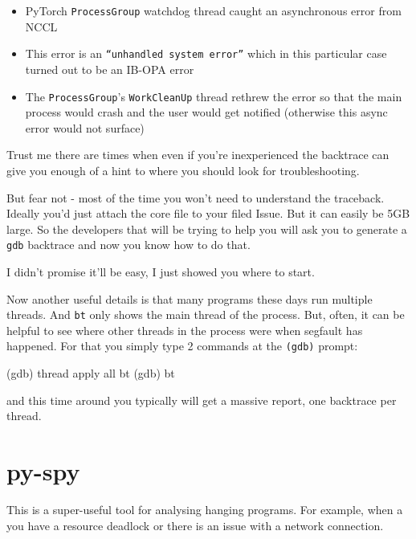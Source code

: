 \documentclass[
]{report}
\newenvironment{Shaded}{\begin{snugshade}}{\end{snugshade}}
\newcommand{\ExtensionTok}[1]{\textcolor[rgb]{0.00,0.23,0.31}{#1}}
\newcommand{\FunctionTok}[1]{\textcolor[rgb]{0.28,0.35,0.67}{#1}}
\newcommand{\KeywordTok}[1]{\textcolor[rgb]{0.00,0.23,0.31}{#1}}
\newcommand{\NormalTok}[1]{\textcolor[rgb]{0.00,0.23,0.31}{#1}}
\providecommand{\tightlist}{%
  \setlength{\itemsep}{0pt}\setlength{\parskip}{0pt}}\usepackage{longtable,booktabs,array}
\begin{document}
\begin{itemize}
\tightlist
\item
  PyTorch \texttt{ProcessGroup} watchdog thread caught an asynchronous
  error from NCCL
\item
  This error is an \texttt{“unhandled\ system\ error”} which in this
  particular case turned out to be an IB-OPA error
\item
  The \texttt{ProcessGroup}'s \texttt{WorkCleanUp} thread rethrew the
  error so that the main process would crash and the user would get
  notified (otherwise this async error would not surface)
\end{itemize}

Trust me there are times when even if you're inexperienced the backtrace
can give you enough of a hint to where you should look for
troubleshooting.

But fear not - most of the time you won't need to understand the
traceback. Ideally you'd just attach the core file to your filed Issue.
But it can easily be 5GB large. So the developers that will be trying to
help you will ask you to generate a \texttt{gdb} backtrace and now you
know how to do that.

I didn't promise it'll be easy, I just showed you where to start.

Now another useful details is that many programs these days run multiple
threads. And \texttt{bt} only shows the main thread of the process. But,
often, it can be helpful to see where other threads in the process were
when segfault has happened. For that you simply type 2 commands at the
\texttt{(gdb)} prompt:

\begin{Shaded}
\begin{Highlighting}[]
\KeywordTok{(}\FunctionTok{gdb}\KeywordTok{)} \ExtensionTok{thread}\NormalTok{ apply all bt}
\KeywordTok{(}\FunctionTok{gdb}\KeywordTok{)} \ExtensionTok{bt}
\end{Highlighting}
\end{Shaded}

and this time around you typically will get a massive report, one
backtrace per thread.

\section{py-spy}\label{py-spy}

This is a super-useful tool for analysing hanging programs. For example,
when a you have a resource deadlock or there is an issue with a network
connection.
\end{document}
